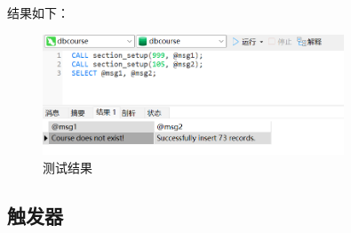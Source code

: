 \documentclass{article}
\begin{document}
\begin{enumerate}
结果如下：

\begin{figure}[H]
  \centering
  \includegraphics[width=0.8\textwidth]{img/16.png}
  \caption{测试结果}
\end{figure}

\end{enumerate}

\subsection{触发器}
\end{document}

